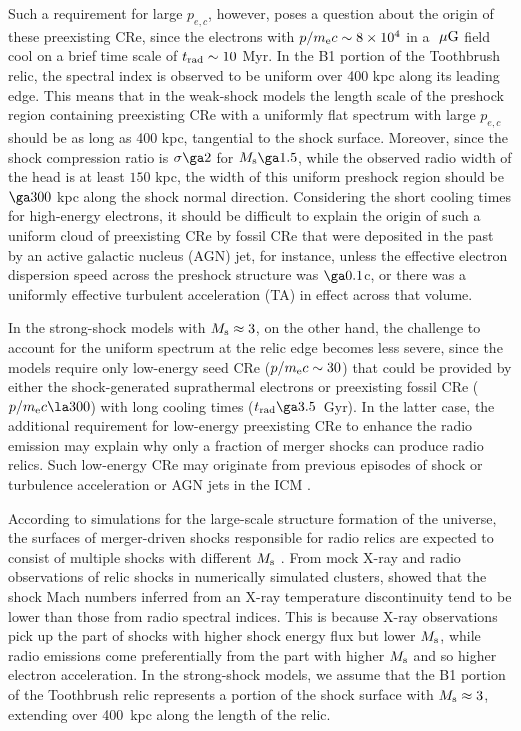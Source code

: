 \documentclass[twocolumn]{aastex61}
\def\muG{~{\mu\rm G}}
\begin{document}
Such a requirement for large $p_{e,c}$, however, poses a question about the origin of these preexisting CRe,
since the electrons with $p/ m_{\rm e} c\sim 8\times10^4$ in a $\muG$ field cool on a brief time scale of
 $t_{\rm rad}\sim 10$ Myr.
In the B1 portion of the Toothbrush relic, the spectral index is observed to be uniform over 400 kpc along its leading edge.
This means that in the weak-shock models the length scale of the preshock region containing preexisting CRe with 
a uniformly flat spectrum with large $p_{e,c}$ should be as long as 400 kpc, tangential to the shock surface.
Moreover, since the shock compression ratio is $\sigma \ga 2$ for $M_{\rm s} \ga 1.5$, while the observed radio width of 
the head is at least $150$ kpc, the width of this uniform preshock region should be $\ga 300$ kpc along the shock normal direction.
Considering the short cooling times for high-energy electrons,
it should be difficult to explain the origin of such a uniform cloud of preexisting CRe
by fossil CRe that were deposited in the past by an active galactic nucleus (AGN) jet, for instance, unless the effective electron dispersion speed 
across the preshock structure was $\ga 0.1$c, or there was a uniformly effective turbulent acceleration (TA) in effect across that volume.

In the strong-shock models with $M_{\rm s}\approx 3$, on the other hand, 
the challenge to account for the uniform spectrum at the relic edge becomes less severe, 
since the models require only low-energy seed CRe ($p/ m_{\rm e} c\sim 30$) that could be provided by either the shock-generated 
suprathermal electrons or preexisting fossil CRe ($p/ m_{\rm e} c\la 300$) with long cooling times ($t_{\rm rad}\ga 3.5$~Gyr).
In the latter case, the additional requirement for low-energy preexisting CRe 
to enhance the radio emission may explain why only a fraction of merger shocks can produce radio relics.
Such low-energy CRe may originate from previous episodes of shock or turbulence acceleration or AGN jets in the ICM \citep[e.g.,][]{ensslin99,pinzke13}.

According to simulations for the large-scale structure formation of the universe,
the surfaces of merger-driven shocks responsible for radio relics are expected to consist of multiple shocks
with different $M_{\rm s}$ \citep[see, e.g.,][]{skillman2008,vazza09}.
From mock X-ray and radio observations of relic shocks in numerically simulated clusters, \citet{hong15} showed that
the shock Mach numbers inferred from an X-ray temperature discontinuity tend to be lower than those from radio spectral indices.
This is because X-ray observations pick up the part of shocks with higher shock energy flux but lower $M_{\rm s}$,
while radio emissions come preferentially from the part with higher $M_{\rm s}$ and so higher electron acceleration.
In the strong-shock models, we assume that the B1 portion of the Toothbrush relic represents 
a portion of the shock surface with $M_{\rm s}\approx 3$,
extending over 400~kpc along the length of the relic.
\end{document}
